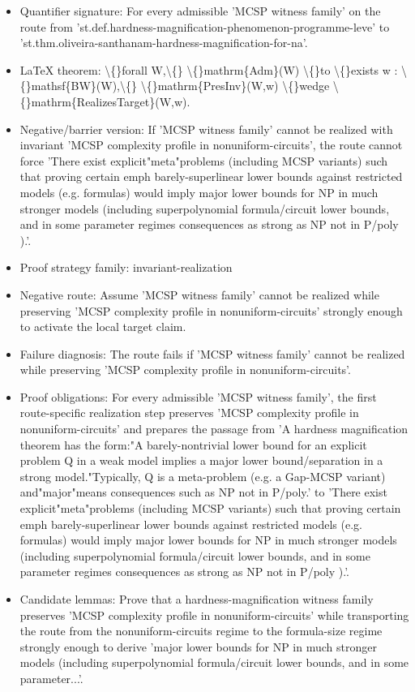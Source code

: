 \documentclass[11pt]{article}
\begin{document}
\begin{itemize}
\item Quantifier signature: For every admissible 'MCSP witness family' on the route from 'st.def.hardness-magnification-phenomenon-programme-leve' to 'st.thm.oliveira-santhanam-hardness-magnification-for-na'.
\item LaTeX theorem: \textbackslash\{\}forall W,\textbackslash\{\} \textbackslash\{\}mathrm\{Adm\}(W) \textbackslash\{\}to \textbackslash\{\}exists w : \textbackslash\{\}mathsf\{BW\}(W),\textbackslash\{\} \textbackslash\{\}mathrm\{PresInv\}(W,w) \textbackslash\{\}wedge \textbackslash\{\}mathrm\{RealizesTarget\}(W,w).
\item Negative/barrier version: If 'MCSP witness family' cannot be realized with invariant 'MCSP complexity profile in nonuniform-circuits', the route cannot force 'There exist explicit"meta"problems (including MCSP variants) such that proving certain emph barely-superlinear lower bounds against restricted models (e.g. formulas) would imply major lower bounds for NP in much stronger models (including superpolynomial formula/circuit lower bounds, and in some parameter regimes consequences as strong as NP not in P/poly ).'.
\item Proof strategy family: invariant-realization
\item Negative route: Assume 'MCSP witness family' cannot be realized while preserving 'MCSP complexity profile in nonuniform-circuits' strongly enough to activate the local target claim.
\item Failure diagnosis: The route fails if 'MCSP witness family' cannot be realized while preserving 'MCSP complexity profile in nonuniform-circuits'.
\item Proof obligations: For every admissible 'MCSP witness family', the first route-specific realization step preserves 'MCSP complexity profile in nonuniform-circuits' and prepares the passage from 'A hardness magnification theorem has the form:"A barely-nontrivial lower bound for an explicit problem Q in a weak model implies a major lower bound/separation in a strong model."Typically, Q is a meta-problem (e.g. a Gap-MCSP variant) and"major"means consequences such as NP not in P/poly.' to 'There exist explicit"meta"problems (including MCSP variants) such that proving certain emph barely-superlinear lower bounds against restricted models (e.g. formulas) would imply major lower bounds for NP in much stronger models (including superpolynomial formula/circuit lower bounds, and in some parameter regimes consequences as strong as NP not in P/poly ).'.
\item Candidate lemmas: Prove that a hardness-magnification witness family preserves 'MCSP complexity profile in nonuniform-circuits' while transporting the route from the nonuniform-circuits regime to the formula-size regime strongly enough to derive 'major lower bounds for NP in much stronger models (including superpolynomial formula/circuit lower bounds, and in some parameter...'.

\end{itemize}
\end{document}
